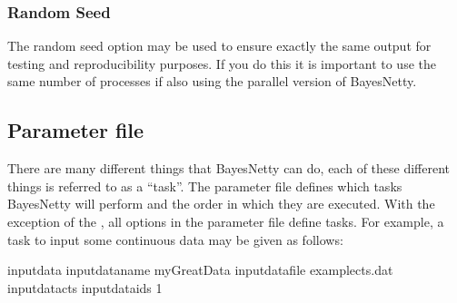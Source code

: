 \documentclass[letterpaper,10pt,english]{sphinxmanual}
\begin{document}
\subsubsection{Random Seed}
\label{\detokenize{using:random-seed}}
\sphinxAtStartPar
The random seed option  may be used to ensure exactly the same output for testing and reproducibility purposes.
If you do this it is important to use the same number of processes if also using the parallel version of BayesNetty.


\subsection{Parameter file}
\label{\detokenize{using:parameter-file}}
\sphinxAtStartPar
There are many different things that BayesNetty can do, each of these different things is referred to as a “task”.
The parameter file defines which tasks BayesNetty will perform and the order in which they are executed. With the exception of the {\hyperref[\detokenize{using:basic-options}]{}},
all options in the parameter file define tasks. For example, a task to input some continuous data may be given as follows:

\begin{sphinxVerbatim}[commandchars=\\\{\}]
\PYGZhy{}input\PYGZhy{}data
\PYGZhy{}input\PYGZhy{}data\PYGZhy{}name myGreatData
\PYGZhy{}input\PYGZhy{}data\PYGZhy{}file example\PYGZhy{}cts.dat
\PYGZhy{}input\PYGZhy{}data\PYGZhy{}cts
\PYGZhy{}input\PYGZhy{}data\PYGZhy{}ids 1
\end{sphinxVerbatim}
\end{document}
